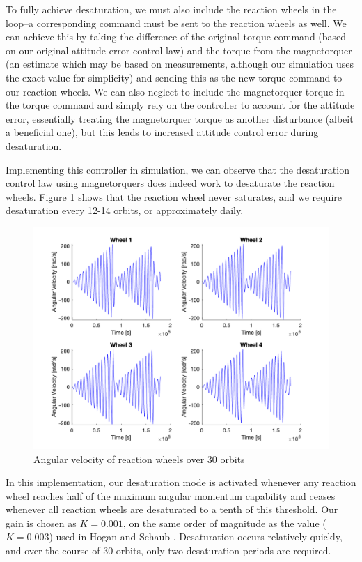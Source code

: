 To fully achieve desaturation, we must also include the reaction wheels in the loop–a corresponding command must be sent to the reaction wheels as well. We can achieve this by taking the difference of the original torque command (based on our original attitude error control law) and the torque from the magnetorquer (an estimate which may be based on measurements, although our simulation uses the exact value for simplicity) and sending this as the new torque command to our reaction wheels. We can also neglect to include the magnetorquer torque in the torque command and simply rely on the controller to account for the attitude error, essentially treating the magnetorquer torque as another disturbance (albeit a beneficial one), but this leads to increased attitude control error during desaturation.

Implementing this controller in simulation, we can observe that the desaturation control law using magnetorquers does indeed work to desaturate the reaction wheels. Figure \ref{fig:ps10_angular_velocity} shows that the reaction wheel never saturates, and we require desaturation every 12-14 orbits, or approximately daily.

\begin{figure}[H]
\centering
\includegraphics[scale=0.3]{Images/ps10_angular_velocity.png}
\caption{Angular velocity of reaction wheels over 30 orbits}
\label{fig:ps10_angular_velocity}
\end{figure}

In this implementation, our desaturation mode is activated whenever any reaction wheel reaches half of the maximum angular momentum capability and ceases whenever all reaction wheels are desaturated to a tenth of this threshold. Our gain is chosen as $K = 0.001$, on the same order of magnitude as the value ($K = 0.003$) used in Hogan and Schaub \cite{Hogan2015}. Desaturation occurs relatively quickly, and over the course of 30 orbits, only two desaturation periods are required.

